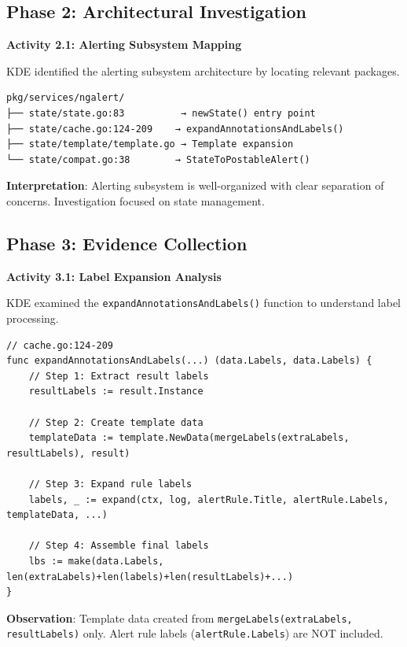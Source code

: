 \documentclass[
    11pt,
    a4paper,
    oneside,
    parskip=full,
    headings=big,
    bibliography=totoc
]{scrartcl}
\newcommand{\code}[1]{\texttt{#1}}
\begin{document}
\subsection*{Phase 2: Architectural Investigation}

\begin{actionbox}
    \textbf{Activity 2.1: Alerting Subsystem Mapping}
    
    KDE identified the alerting subsystem architecture by locating relevant packages.
    
    \vspace{0.3cm}
    \begin{evidencebox}
    \begin{verbatim}
pkg/services/ngalert/
├── state/state.go:83          → newState() entry point
├── state/cache.go:124-209    → expandAnnotationsAndLabels()
├── state/template/template.go → Template expansion
└── state/compat.go:38        → StateToPostableAlert()
    \end{verbatim}
    \end{evidencebox}
    
    \vspace{0.3cm}
    \textbf{Interpretation}: Alerting subsystem is well-organized with clear 
    separation of concerns. Investigation focused on state management.
\end{actionbox}

\subsection*{Phase 3: Evidence Collection}

\begin{actionbox}
    \textbf{Activity 3.1: Label Expansion Analysis}
    
    KDE examined the \code{expandAnnotationsAndLabels()} function to understand 
    label processing.
    
    \vspace{0.3cm}
    \begin{evidencebox}
    \begin{verbatim}
// cache.go:124-209
func expandAnnotationsAndLabels(...) (data.Labels, data.Labels) {
    // Step 1: Extract result labels
    resultLabels := result.Instance
    
    // Step 2: Create template data
    templateData := template.NewData(mergeLabels(extraLabels, resultLabels), result)
    
    // Step 3: Expand rule labels
    labels, _ := expand(ctx, log, alertRule.Title, alertRule.Labels, templateData, ...)
    
    // Step 4: Assemble final labels
    lbs := make(data.Labels, len(extraLabels)+len(labels)+len(resultLabels)+...)
}
    \end{verbatim}
    \end{evidencebox}
    
    \vspace{0.3cm}
    \textbf{Observation}: Template data created from 
    \code{mergeLabels(extraLabels, resultLabels)} only. 
    Alert rule labels (\code{alertRule.Labels}) are NOT included.
\end{actionbox}
\end{document}
